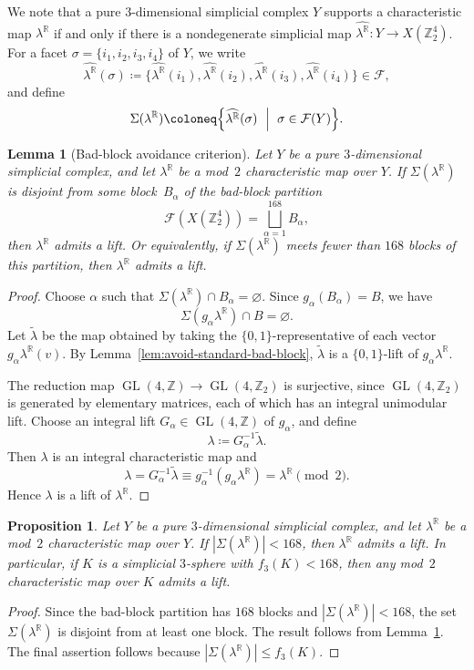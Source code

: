 \documentclass{amsart}
\newcommand{\Z}{\mathbb{Z}}
\newcommand{\R}{\mathbb{R}}
\newcommand{\cF}{\mathcal{F}}
\DeclareMathOperator{\GL}{GL}
\newtheorem{proposition}[theorem]{Proposition}
\newtheorem{lemma}[theorem]{Lemma}
\theoremstyle{definition}
\theoremstyle{remark}
\begin{document}
We note that a pure $3$-dimensional simplicial complex $Y$ supports a characteristic map $\lambda^\R$ if and only if there is a nondegenerate simplicial map $\widehat{\lambda^\R} \colon Y \to X(\Z_2^4)$.
For a facet $\sigma = \{i_1, i_2, i_3, i_4\}$ of $Y$, we write
$$
    \widehat{\lambda^\R}(\sigma) \coloneq\{\widehat{\lambda^\R}(i_1),\widehat{\lambda^\R}(i_2),\widehat{\lambda^\R}(i_3),\widehat{\lambda^\R}(i_4)\}\in\cF,
$$
and define
$$
    \Sigma(\lambda^\R)\coloneq \Bigl\{\widehat{\lambda^\R}(\sigma)\ \Bigm|\ \sigma\in\cF(Y)\Bigr\}.
$$

\begin{lemma}[Bad-block avoidance criterion]\label{lem:block-avoidance}
    Let $Y$ be a pure $3$-dimensional simplicial complex, and let $\lambda^\R$ be a mod~$2$ characteristic map over $Y$.
    If $\Sigma(\lambda^\R)$ is disjoint from some block~$B_\alpha$ of the bad-block partition
    $$
        \cF(X(\Z_2^4))=\bigsqcup_{\alpha=1}^{168}B_\alpha,
    $$
    then $\lambda^\R$ admits a lift.
    Or equivalently, if $\Sigma(\lambda^\R)$ meets fewer than $168$ blocks of this partition, then $\lambda^\R$ admits a lift.
\end{lemma}
\begin{proof}
    Choose $\alpha$ such that $\Sigma(\lambda^\R)\cap B_\alpha=\varnothing$.
    Since $g_\alpha(B_\alpha)=B$, we have
    $$
        \Sigma(g_\alpha\lambda^\R)\cap B=\varnothing.
    $$
    Let $\widetilde\lambda$ be the map obtained by taking the $\{0,1\}$-representative of each vector~$g_\alpha\lambda^\R(v)$.
    By Lemma~\ref{lem:avoid-standard-bad-block}, $\widetilde\lambda$ is a $\{0,1\}$-lift of $g_\alpha\lambda^\R$.
    
    The reduction map $\GL(4,\Z) \to \GL(4,\Z_2)$ is surjective, since $\GL(4,\Z_2)$ is generated by elementary matrices, each of which has an integral unimodular lift.
    Choose an integral lift $G_\alpha\in \GL(4,\Z)$ of $g_\alpha$, and define
    $$
        \lambda\coloneq G_\alpha^{-1}\widetilde\lambda.
    $$
    Then $\lambda$ is an integral characteristic map and
    $$
        \lambda=G_\alpha^{-1}\widetilde\lambda \equiv g_\alpha^{-1}(g_\alpha\lambda^\R)=\lambda^\R \pmod 2.
    $$
    Hence $\lambda$ is a lift of $\lambda^\R$.
\end{proof}

\begin{proposition}\label{prop:168}
    Let $Y$ be a pure $3$-dimensional simplicial complex, and let $\lambda^\R$ be a mod~$2$ characteristic map over $Y$.
    If $|\Sigma(\lambda^\R)|<168$, then $\lambda^\R$ admits a lift.
    In particular, if $K$ is a simplicial $3$-sphere with $f_3(K)<168$, then any mod~$2$ characteristic map over $K$ admits a lift.
\end{proposition}
\begin{proof}
    Since the bad-block partition has $168$ blocks and $|\Sigma(\lambda^\R)|<168$, the set~$\Sigma(\lambda^\R)$ is disjoint from at least one block.
    The result follows from Lemma~\ref{lem:block-avoidance}.
    The final assertion follows because $|\Sigma(\lambda^\R)|\le f_3(K)$.
\end{proof}
\end{document}
